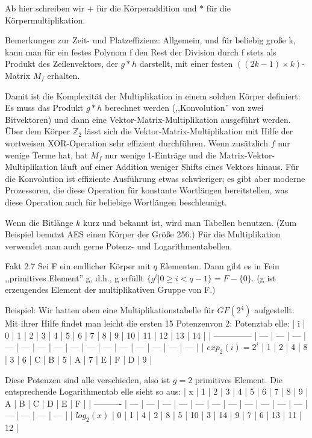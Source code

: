 \documentclass[a4paper]{article}
\begin{document}
\begin{multicols}{3}
    Ab hier schreiben wir $+$ für die Körperaddition und $*$ für die Körpermultiplikation.

    Bemerkungen zur Zeit- und Platzeffizienz: Allgemein, und für beliebig große k, kann man für ein festes Polynom f den Rest der Division durch f stets als Produkt des Zeilenvektors, der $g*h$ darstellt, mit einer festen $((2k-1)\times k)$-Matrix $M_f$ erhalten.

    Damit ist die Komplexität der Multiplikation in einem solchen Körper definiert: Es muss das Produkt $g*h$ berechnet werden (,,Konvolution'' von zwei Bitvektoren) und dann eine Vektor-Matrix-Multiplikation ausgeführt werden. Über dem Körper $\mathbb{Z}_2$ lässt sich die Vektor-Matrix-Multiplikation mit Hilfe der wortweisen XOR-Operation sehr effizient durchführen. Wenn zusätzlich $f$ nur wenige Terme hat, hat $M_f$ nur wenige 1-Einträge und die Matrix-Vektor-Multiplikation läuft auf einer Addition weniger Shifts eines Vektors hinaus. Für die Konvolution ist effiziente Ausführung etwas schwieriger; es gibt aber moderne Prozessoren, die diese Operation für konstante Wortlängen bereitstellen, was diese Operation auch für beliebige Wortlängen beschleunigt.

    Wenn die Bitlänge $k$ kurz und bekannt ist, wird man Tabellen benutzen. (Zum Beispiel benutzt AES einen Körper der Größe 256.) Für die Multiplikation verwendet man auch gerne Potenz- und Logarithmentabellen.

    Fakt 2.7 Sei F ein endlicher Körper mit $q$ Elementen. Dann gibt es in Fein ,,primitives Element'' g, d.h., g erfüllt $\{g^i| 0 \geq i < q-1\}=F-\{0\}$. (g ist erzeugendes Element der multiplikativen Gruppe von F.)

    Beispiel: Wir hatten oben eine Multiplikationstabelle für $GF(2^4)$ aufgestellt. Mit ihrer Hilfe findet man leicht die ersten 15 Potenzenvon 2:
    Potenztab elle:
    | i              | 0   | 1   | 2   | 3   | 4   | 5   | 6   | 7   | 8   | 9   | 10  | 11  | 12  | 13  | 14  |
    | -------------- | --- | --- | --- | --- | --- | --- | --- | --- | --- | --- | --- | --- | --- | --- | --- |
    | $exp_2(i)=2^i$ | 1   | 2   | 4   | 8   | 3   | 6   | C   | B   | 5   | A   | 7   | E   | F   | D   | 9   |

    Diese Potenzen sind alle verschieden, also ist $g=2$ primitives Element. Die entsprechende Logarithmentab elle sieht so aus:
    | x          | 1   | 2   | 3   | 4   | 5   | 6   | 7   | 8   | 9   | A   | B   | C   | D   | E   | F   |
    | ---------- | --- | --- | --- | --- | --- | --- | --- | --- | --- | --- | --- | --- | --- | --- | --- |
    | $log_2(x)$ | 0   | 1   | 4   | 2   | 8   | 5   | 10  | 3   | 14  | 9   | 7   | 6   | 13  | 11  | 12  |


\end{multicols}
\end{document}
